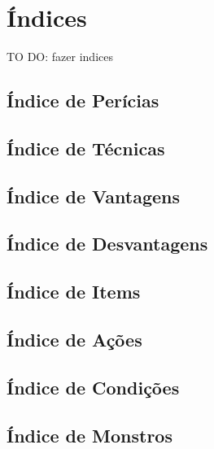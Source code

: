\chapter{Índices}
TO DO: fazer indices
\section{Índice de Perícias}
\section{Índice de Técnicas}
\section{Índice de Vantagens}
\section{Índice de Desvantagens}
\section{Índice de Items}
\section{Índice de Ações}
\section{Índice de Condições}
\section{Índice de Monstros}
